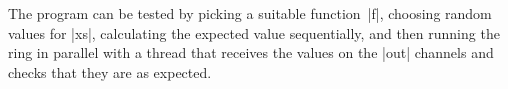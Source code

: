 \begin{answerI}



The program can be tested by picking a suitable function~|f|, choosing random
values for |xs|, calculating the expected value sequentially, and then running
the ring in parallel with a thread that receives the values on the |out|
channels and checks that they are as expected.





\end{answerI}
